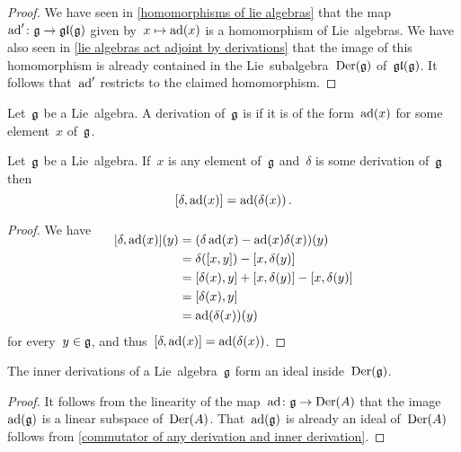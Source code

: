 \begin{proof}
  We have seen in \cref{homomorphisms of lie algebras} that the map~$\ad' \colon \glie \to \gllie(\glie)$ given by~$x \mapsto \ad(x)$ is a homomorphism of Lie~algebras.
  We have also seen in \cref{lie algebras act adjoint by derivations} that the image of this homomorphism is already contained in the Lie~subalgebra~$\operatorname{Der}(\mathfrak{g})$ of~$\mathfrak{gl}(\mathfrak{g})$.
  It follows that~$\operatorname{ad}'$ restricts to the claimed homomorphism.
\end{proof}


\begin{definition}
 Let~$\mathfrak{g}$ be a Lie~algebra.
 A derivation of~$\mathfrak{g}$ is  if it is of the form~$\operatorname{ad}(x)$ for some element~$x$ of~$\mathfrak{g}$.
\end{definition}


\begin{lemma}
  \label{commutator of any derivation and inner derivation}
  Let~$\mathfrak{g}$ be a Lie~algebra.
  If~$x$ is any element of~$\mathfrak{g}$ and~$\delta$ is some derivation of~$\mathfrak{g}$ then
  \[
    [\delta, \operatorname{ad}(x)] = \operatorname{ad}(\delta(x)) \,.
  \]
\end{lemma}


\begin{proof}
  We have
  \begin{align*}
    \SwapAboveDisplaySkip
    [\delta, \ad(x)](y)
    &= 
    (\delta \ad(x) - \ad(x) \delta(x))(y)
    \\
    &=
    \delta([x,y]) - [x,\delta(y)]
    \\
    &=
    [\delta(x),y] + [x,\delta(y)] - [x,\delta(y)]
    \\
    &=
    [\delta(x),y]
    \\
    &=
    \ad(\delta(x))(y)
  \end{align*}
  for every~$y \in \mathfrak{g}$, and thus~$[\delta, \operatorname{ad}(x)] = \operatorname{ad}(\delta(x))$.
\end{proof}


\begin{corollary}
  \label{inner derivations are an ideal}
  The inner derivations of a Lie~algebra~$\mathfrak{g}$ form an ideal inside~$\operatorname{Der}(\mathfrak{g})$.
\end{corollary}


\begin{proof}
  It follows from the linearity of the map~$\ad \colon \glie \to \Der(A)$ that the image~$\operatorname{ad}(\mathfrak{g})$ is a linear subspace of~$\operatorname{Der}(A)$.
  That~$\operatorname{ad}(\mathfrak{g})$ is already an ideal of~$\operatorname{Der}(A)$ follows from \cref{commutator of any derivation and inner derivation}.
\end{proof}


